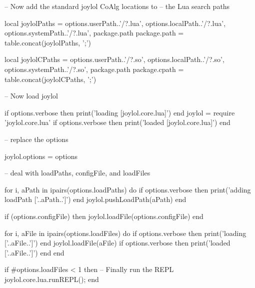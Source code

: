 -- Now add the standard joylol CoAlg locations to
-- the Lua search paths 

local joylolPaths = {
  options.userPath..'/?.lua',
  options.localPath..'/?.lua',
  options.systemPath..'/?.lua',
  package.path
}
package.path = table.concat(joylolPaths, ';')

local joylolCPaths = {
  options.userPath..'/?.so',
  options.localPath..'/?.so',
  options.systemPath..'/?.so',
  package.path
}
package.cpath = table.concat(joylolCPaths, ';')

-- Now load joylol

if options.verbose then print('loading [joylol.core.lua]') end
joylol = require 'joylol.core.lua'
if options.verbose then print('loaded [joylol.core.lua]\n') end

-- replace the options

joylol.options = options

--  deal with loadPaths, configFile, and loadFiles

for i, aPath in ipairs(options.loadPaths) do
  if options.verbose then print('adding loadPath ['..aPath..']\n') end
  joylol.pushLoadPath(aPath)
end

if (options.configFile) then
  joylol.loadFile(options.configFile)
end

for i, aFile in ipairs(options.loadFiles) do
  if options.verbose then print('loading ['..aFile..']\n') end
  joylol.loadFile(aFile)
  if options.verbose then print('loaded ['..aFile..']\n') end
end

if #options.loadFiles < 1 then
  -- Finally run the REPL
  joylol.core.lua.runREPL();
end

\stopLuaCode
